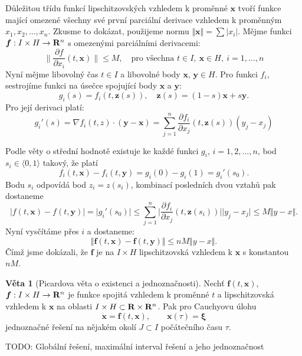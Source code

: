 \documentclass[a4paper, 12pt]{book}
\theoremstyle{definition}
\newtheorem{theorem}{Věta}[section]
\def\grad{\nabla}
\def\to{\rightarrow}
\def\Real{{\rm\bf R}}
\def\vc#1{\mathbf{\boldsymbol{#1}}}     %
\def\abs#1{\lvert#1\rvert}
\def\norm#1{\bigl\Vert#1\bigr\Vert} %
\def\prtl{\partial}                                        %
\def\todo#1{{\color{green}TODO:} #1}
\begin{document}
Důležitou třídu funkcí lipschitzovských vzhledem k proměnné $\vc x$ 
tvoří funkce mající omezené všechny své první parciální derivace vzhledem k proměnným 
$x_1, x_2, \dots, x_n$. Zkusme to dokázat, použijeme normu $\norm{\vc x} = \sum \abs{x_i}$. Mějme funkci $\vc f: I \times H \to \Real^n$
s omezenými parciálními derivacemi:
\[
    \Big\| \frac{\prtl f}{\prtl x_i}(t, \vc x) \Big\| \le M, \quad \text{pro všechna } t\in I,\ \vc x \in H,\ i=1,\dots, n
\]
Nyní mějme libovolný čas $t\in I$ a libovolné body $\vc x,\, \vc y\in H$. Pro funkci $f_i$, sestrojíme funkci 
na úsečce spojující body $\vc x$ a $\vc y$:
\[
   g_i(s) = f_i(t, \vc z(s)),\quad \vc z(s) = (1-s) \vc x + s \vc y.
\]
Pro její derivaci platí:
\[
  g_i'(s) = \grad f_i(t, z) \cdot (\vc y - \vc x) = \sum_{j=1}^{n} \frac{\prtl f_i}{\prtl x_j}(t, \vc z(s)) (y_j - x_j)
\]


Podle věty o střední hodnotě existuje ke každé funkci $g_i$, $i=1,2,\dots,n$,
bod $s_i\in \langle 0, 1\rangle$ takový, že platí
\[
    f_i(t, \vc x)-f_i(t, \vc y)= g_i(0) - g_i(1) = g_i'(s_0).
\]
Bodu $s_i$ odpovídá bod $z_i = z(s_i)$, kombinací posledních dvou vztahů pak dostaneme
\[
  \abs{f(t, \vc x)-f(t, \vc y)} = \abs{g_i'(s_0)} \le \sum_{j=1}^{n} \Big | \frac{\prtl f_i}{\prtl x_j}(t, \vc z(s_i)) \Big | \abs{y_j - x_j} \le M\norm{y - x}.
\]
Nyní vysčítáme přes  $i$ a dostaneme:
\[
  \norm{ \vc f(t, \vc x) - \vc f(t,\vc y) } \le nM \norm{y-x}.
\]
Čímž jsme dokázali, že $\vc f$ je na $I\times H$ lipschitzovská vzhledem k $\vc x$ s konstantou $nM$.




\begin{theorem}[Picardova věta o existenci a jednoznačnosti]
\label{thm::Picard}
Nechť $\vc f(t, \vc x)$, $\vc f: I\times H \to \Real^n$ je funkce spojitá vzhledem k proměnné $t$ a lipschitzovská vzhledem k $\vc x$
na oblasti $I\times H \subset \Real \times \Real ^n$. Pak pro Cauchyovu úlohu
\begin{equation}
 \dot{\vc x}=\vc f(t,\vc x),\qquad \vc x(\tau)=\vc \xi
\end{equation}
jednoznačné řešení na nějakém okolí $J\subset I$ počátečního času $\tau$.
\end{theorem}
\todo{Globální řešení, maximální interval řešení a jeho jednoznačnost}

\end{document}
